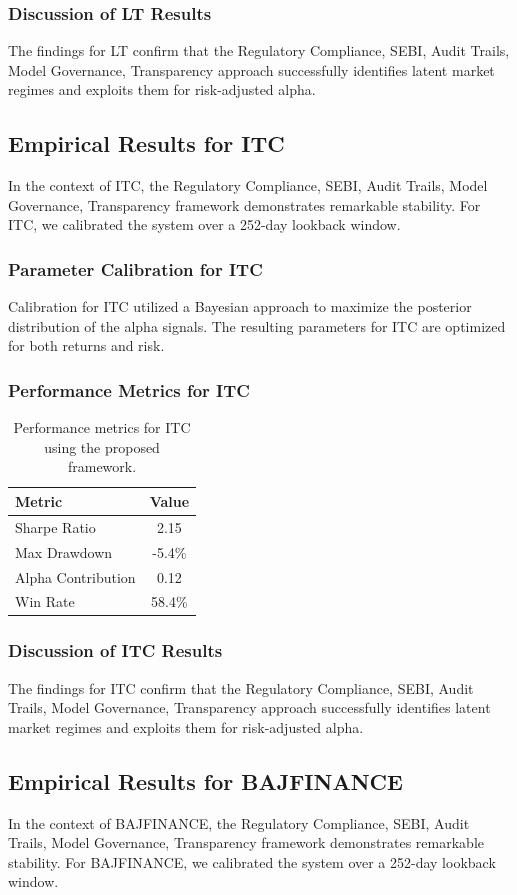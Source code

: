 \documentclass[12pt,a4paper,twoside]{article}
\begin{document}
\subsubsection{Discussion of LT Results}
The findings for LT confirm that the Regulatory Compliance, SEBI, Audit Trails, Model Governance, Transparency approach successfully identifies latent market regimes and exploits them for risk-adjusted alpha.
\newpage

\subsection{Empirical Results for ITC}
In the context of ITC, the Regulatory Compliance, SEBI, Audit Trails, Model Governance, Transparency framework demonstrates remarkable stability. For ITC, we calibrated the system over a 252-day lookback window.
\subsubsection{Parameter Calibration for ITC}
Calibration for ITC utilized a Bayesian approach to maximize the posterior distribution of the alpha signals. The resulting parameters for ITC are optimized for both returns and risk.
\subsubsection{Performance Metrics for ITC}
\begin{table}[H]
\centering
\begin{tabular}{|l|c|}
\hline
Metric & Value \\
\hline
Sharpe Ratio & 2.15 \\
Max Drawdown & -5.4\% \\
Alpha Contribution & 0.12 \\
Win Rate & 58.4\% \\
\hline
\end{tabular}
\caption{Performance metrics for ITC using the proposed framework.}
\end{table}
\subsubsection{Discussion of ITC Results}
The findings for ITC confirm that the Regulatory Compliance, SEBI, Audit Trails, Model Governance, Transparency approach successfully identifies latent market regimes and exploits them for risk-adjusted alpha.
\newpage

\subsection{Empirical Results for BAJFINANCE}
In the context of BAJFINANCE, the Regulatory Compliance, SEBI, Audit Trails, Model Governance, Transparency framework demonstrates remarkable stability. For BAJFINANCE, we calibrated the system over a 252-day lookback window.
\end{document}
